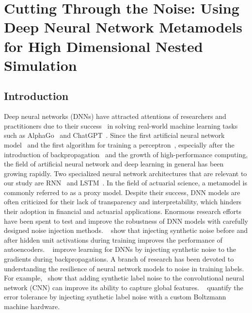 \chapter{Cutting Through the Noise: Using Deep Neural Network Metamodels for High Dimensional Nested Simulation}
\label{chap:project2}


\section{Introduction}

Deep neural networks (DNNs) have attracted attentions of researchers and practitioners due to their success~\citep{hastie2009elements,lecun2015deep} in solving real-world machine learning tasks such as AlphaGo~\citep{silver2016mastering} and ChatGPT~\citep{chatgpt}.
Since the first artificial neural network model~\citep{mcculloch1943logical} and the first algorithm for training a perceptron~\citep{rosenblatt1958perceptron}, especially after the introduction of backpropagation~\citep{rumelhart1985learning} and the growth of high-performance computing, the field of artificial neural network and deep learning in general has been growing rapidly.
Two specialized neural network architectures that are relevant to our study are RNN~\citep{williams1989learning,sutskever2014sequence} and LSTM~\citep{hochreiter1997long,chung2014empirical}.
In the field of actuarial science, a metamodel is commonly referred to as a proxy model.
Despite their success, DNN models are often criticized for their lack of transparency and interpretability, which hinders their adoption in financial and actuarial applications.
Enormous research efforts have been spent to test and improve the robustness of DNN models with carefully designed noise injection methods.
~\cite{poole2014analyzing} show that injecting synthetic noise before and after hidden unit activations during training improves the performance of autoencoders.
~\cite{neelakantan2015adding} improve learning for DNNs by injecting synthetic noise to the gradients during backpropagations.
A branch of research has been devoted to understanding the resilience of neural network models to noise in training labels.
For example,~\cite{luo2016understanding} show that adding synthetic label noise to the convolutional neural network (CNN) can improve its ability to capture global features. 
~\cite{srivastava2014dropout} quantify the error tolerance by injecting synthetic label noise with a custom Boltzmann machine hardware.
